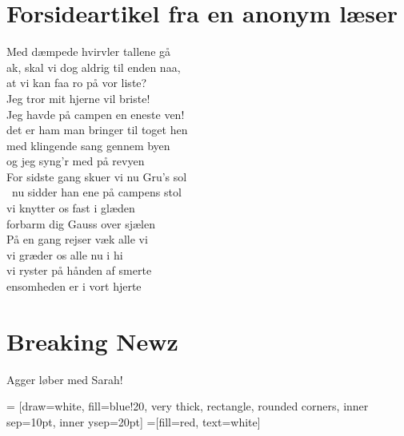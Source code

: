 

\begin{minipage}[b]{0.95\linewidth}
\begin{minipage}[t]{0.47\textwidth}
\vspace{3mm}
\section*{Forsideartikel fra en anonym læser}

Med dæmpede hvirvler tallene gå \\
ak, skal vi dog aldrig til enden naa, \\
at vi kan faa ro på vor liste? \\
Jeg tror mit hjerne vil briste! \\
 
Jeg havde på campen en eneste ven! \\
det er ham man bringer til toget hen \\
med klingende sang gennem byen \\
og jeg syng'r med på revyen \\

For sidste gang skuer vi nu Gru's sol \\\
nu sidder han ene på campens stol \\
vi knytter os fast i glæden \\
forbarm dig Gauss over sjælen \\

På en gang rejser væk alle vi \\
vi græder os alle nu i hi \\
vi ryster på hånden af smerte \\
ensomheden er i vort hjerte \\

\section*{\Huge Breaking Newz}
\Huge Agger løber med Sarah!

\end{minipage}
\hfill\begin{minipage}[t]{0.47\textwidth}

\vspace{1mm}
 = [draw=white, fill=blue!20, very thick,
    rectangle, rounded corners, inner sep=10pt, inner ysep=20pt]
\tikzstyle{fancytitle} =[fill=red, text=white]


\end{minipage}
\end{minipage}
